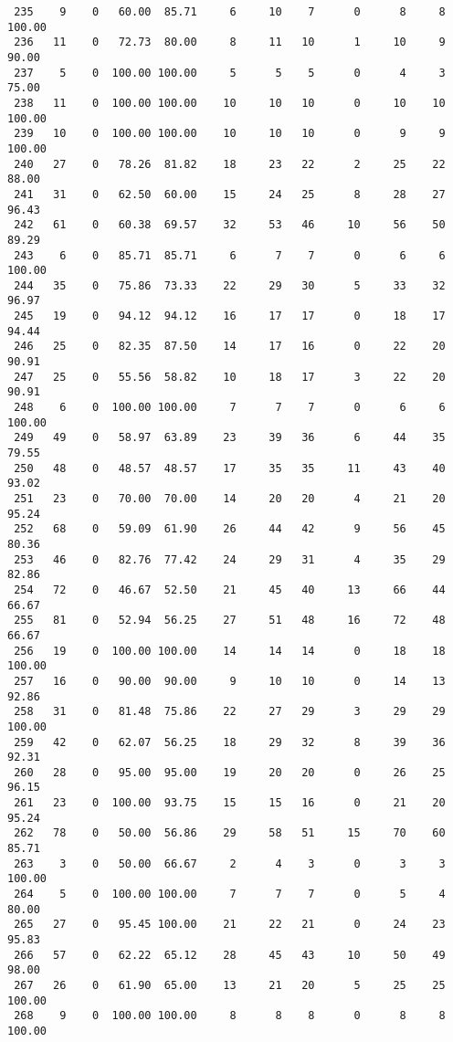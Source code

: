 \begin{verbatim}
 235    9    0   60.00  85.71     6     10    7      0      8     8   100.00
 236   11    0   72.73  80.00     8     11   10      1     10     9    90.00
 237    5    0  100.00 100.00     5      5    5      0      4     3    75.00
 238   11    0  100.00 100.00    10     10   10      0     10    10   100.00
 239   10    0  100.00 100.00    10     10   10      0      9     9   100.00
 240   27    0   78.26  81.82    18     23   22      2     25    22    88.00
 241   31    0   62.50  60.00    15     24   25      8     28    27    96.43
 242   61    0   60.38  69.57    32     53   46     10     56    50    89.29
 243    6    0   85.71  85.71     6      7    7      0      6     6   100.00
 244   35    0   75.86  73.33    22     29   30      5     33    32    96.97
 245   19    0   94.12  94.12    16     17   17      0     18    17    94.44
 246   25    0   82.35  87.50    14     17   16      0     22    20    90.91
 247   25    0   55.56  58.82    10     18   17      3     22    20    90.91
 248    6    0  100.00 100.00     7      7    7      0      6     6   100.00
 249   49    0   58.97  63.89    23     39   36      6     44    35    79.55
 250   48    0   48.57  48.57    17     35   35     11     43    40    93.02
 251   23    0   70.00  70.00    14     20   20      4     21    20    95.24
 252   68    0   59.09  61.90    26     44   42      9     56    45    80.36
 253   46    0   82.76  77.42    24     29   31      4     35    29    82.86
 254   72    0   46.67  52.50    21     45   40     13     66    44    66.67
 255   81    0   52.94  56.25    27     51   48     16     72    48    66.67
 256   19    0  100.00 100.00    14     14   14      0     18    18   100.00
 257   16    0   90.00  90.00     9     10   10      0     14    13    92.86
 258   31    0   81.48  75.86    22     27   29      3     29    29   100.00
 259   42    0   62.07  56.25    18     29   32      8     39    36    92.31
 260   28    0   95.00  95.00    19     20   20      0     26    25    96.15
 261   23    0  100.00  93.75    15     15   16      0     21    20    95.24
 262   78    0   50.00  56.86    29     58   51     15     70    60    85.71
 263    3    0   50.00  66.67     2      4    3      0      3     3   100.00
 264    5    0  100.00 100.00     7      7    7      0      5     4    80.00
 265   27    0   95.45 100.00    21     22   21      0     24    23    95.83
 266   57    0   62.22  65.12    28     45   43     10     50    49    98.00
 267   26    0   61.90  65.00    13     21   20      5     25    25   100.00
 268    9    0  100.00 100.00     8      8    8      0      8     8   100.00

\end{verbatim}
